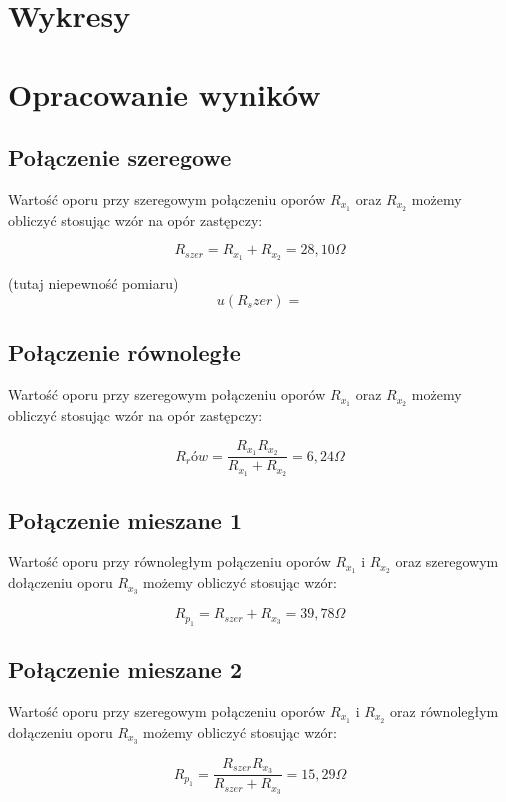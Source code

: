 \documentclass[a4paper,10pt,twoside]{article}
\begin{document}
\section{Wykresy}

\section{Opracowanie wyników}

\subsection{Połączenie szeregowe}

Wartość oporu przy szeregowym połączeniu oporów $R_{x_1}$ oraz $R_{x_2}$ możemy obliczyć stosując wzór na opór zastępczy:

$$ R_{szer} = R_{x_1} + R_{x_2} = 28,10 \unit{\Omega} $$

(tutaj niepewność pomiaru)
$$ u(R_szer) = $$


\subsection{Połączenie równoległe}

Wartość oporu przy szeregowym połączeniu oporów $R_{x_1}$ oraz $R_{x_2}$ możemy obliczyć stosując wzór na opór zastępczy:

$$ R_rów = \frac{R_{x_1} R_{x_2}}{R_{x_1} + R_{x_2}} = 6,24 \unit{\Omega} $$

\subsection{Połączenie mieszane 1}

Wartość oporu przy równoległym połączeniu oporów $R_{x_1}$ i $R_{x_2}$ oraz szeregowym dołączeniu oporu $R_{x_3}$ możemy obliczyć stosując wzór:

$$ R_{p_1} = R_{szer} + R_{x_3} = 39,78 \unit{\Omega} $$

\subsection{Połączenie mieszane 2}

Wartość oporu przy szeregowym połączeniu oporów $R_{x_1}$ i $R_{x_2}$ oraz równoległym dołączeniu oporu $R_{x_3}$ możemy obliczyć stosując wzór:

$$ R_{p_1} = \frac{R_{szer} R_{x_3}}{R_{szer} + R_{x_3}} = 15,29 \unit{\Omega} $$
\end{document}
